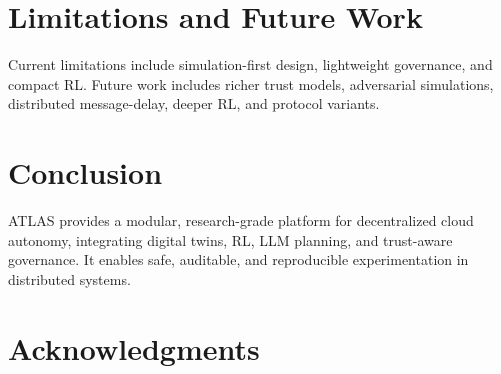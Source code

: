 \documentclass[conference]{IEEEtran}
\begin{document}
\section{Limitations and Future Work}
Current limitations include simulation-first design, lightweight governance, and compact RL. Future work includes richer trust models, adversarial simulations, distributed message-delay, deeper RL, and protocol variants.

\section{Conclusion}
ATLAS provides a modular, research-grade platform for decentralized cloud autonomy, integrating digital twins, RL, LLM planning, and trust-aware governance. It enables safe, auditable, and reproducible experimentation in distributed systems.

\section*{Acknowledgments}



\end{document}
